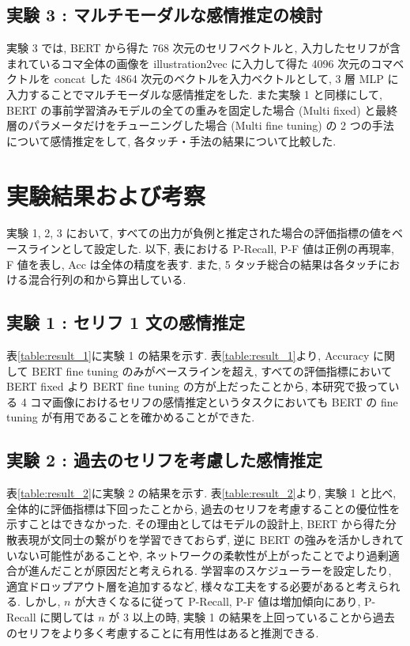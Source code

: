 \documentclass[twocolumn]{jarticle}     %
\begin{document}
\subsection{\small{実験 3 : マルチモーダルな感情推定の検討}}
実験 3 では, BERT から得た 768 次元のセリフベクトルと, 入力したセリフが含まれているコマ全体の画像を illustration2vec に入力して得た 4096 次元のコマベクトルを concat した 4864 次元のベクトルを入力ベクトルとして, 3 層 MLP に入力することでマルチモーダルな感情推定をした. また実験 1 と同様にして, BERT の事前学習済みモデルの全ての重みを固定した場合 (Multi fixed) と最終層のパラメータだけをチューニングした場合 (Multi fine tuning) の 2 つの手法について感情推定をして, 各タッチ・手法の結果について比較した.

\section{実験結果および考察}
実験 1, 2, 3 において, すべての出力が負例と推定された場合の評価指標の値をベースラインとして設定した. 以下, 表における P-Recall, P-F 値は正例の再現率, F 値を表し, Acc は全体の精度を表す. また, 5 タッチ総合の結果は各タッチにおける混合行列の和から算出している.

\subsection{\small{実験 1 : セリフ 1 文の感情推定}}
表\ref{table:result_1}に実験 1 の結果を示す.
表\ref{table:result_1}より, Accuracy に関して BERT fine tuning のみがベースラインを超え, すべての評価指標において BERT fixed より BERT fine tuning の方が上だったことから, 本研究で扱っている 4 コマ画像におけるセリフの感情推定というタスクにおいても BERT の fine tuning が有用であることを確かめることができた.

\subsection{\small{実験 2 : 過去のセリフを考慮した感情推定}}
表\ref{table:result_2}に実験 2 の結果を示す.
表\ref{table:result_2}より, 実験 1 と比べ, 全体的に評価指標は下回ったことから, 過去のセリフを考慮することの優位性を示すことはできなかった. その理由としてはモデルの設計上, BERT から得た分散表現が文同士の繋がりを学習できておらず, 逆に BERT の強みを活かしきれていない可能性があることや, ネットワークの柔軟性が上がったことでより過剰適合が進んだことが原因だと考えられる. 学習率のスケジューラーを設定したり, 適宜ドロップアウト層を追加するなど, 様々な工夫をする必要があると考えられる. しかし, $n$ が大きくなるに従って P-Recall, P-F 値は増加傾向にあり, P-Recall に関しては $n$ が 3 以上の時, 実験 1 の結果を上回っていることから過去のセリフをより多く考慮することに有用性はあると推測できる.
\end{document}

